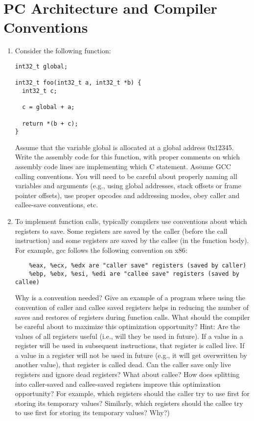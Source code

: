 \section{PC Architecture and Compiler Conventions}
\begin{enumerate}
\item Consider the following function:
\begin{verbatim}
int32_t global;

int32_t foo(int32_t a, int32_t *b) {
  int32_t c;

  c = global + a;
  
  return *(b + c);
}
\end{verbatim}
Assume that the variable global is allocated at a global address 0x12345. Write
the assembly code for this function, with proper comments on which assembly code
lines are implementing which C statement. Assume GCC calling conventions. You will
need to be careful about properly naming all variables and
arguments (e.g., using global addresses, stack offsets or frame pointer offsets),
use proper opcodes and addressing modes, obey caller and callee-save conventions, etc. 

\item To implement function calls, typically compilers use conventions about which registers
to save. Some registers are saved by the caller (before the call instruction) and some
registers are saved by the callee (in the function body). For example, gcc follows the
following convention on x86:
\begin{verbatim}
    %eax, %ecx, %edx are "caller save" registers (saved by caller)
    %ebp, %ebx, %esi, %edi are "callee save" registers (saved by callee) 
\end{verbatim}
Why is a convention needed?
Give an example of a program where using the convention of caller and callee saved registers helps in reducing the number of saves and restores of registers during function calls. What should the compiler be careful about to maximize this optimization opportunity? Hint: Are the values of all registers useful (i.e., will they be used in future). If a value in a register will be used in subsequent instructions, that register is called live. If a value in a register will not be used in future (e.g., it will get overwritten by another value), that register is called dead. Can the caller save only live registers and ignore dead registers? What about callee? How does splitting into caller-saved and callee-saved registers improve this optimization opportunity? For example, which registers should the caller try to use first for storing its temporary values? Similarly, which registers should the callee try to use first for storing its temporary values? Why?) 


\end{enumerate}
